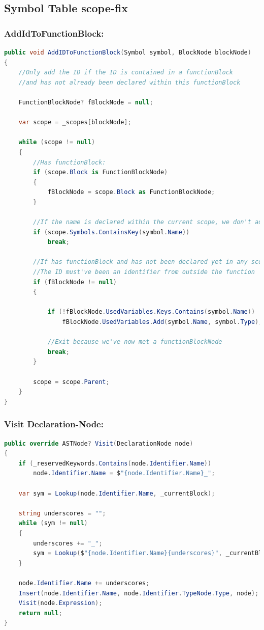 \subsection{Symbol Table scope-fix}
\label{Appendix:ScopeFix}

\subsubsection{AddIdToFunctionBlock:}
\begin{lstlisting}[language = csharp, firstnumber=232, label={list:symbolTable_AddIdToFunction}, caption=AddIdToFunctionBlock - 134-169 - CobraCompiler/SymbolTable.cs]
public void AddIDToFunctionBlock(Symbol symbol, BlockNode blockNode)
{
    //Only add the ID if the ID is contained in a functionBlock
    //and has not already been declared within this functionBlock

    FunctionBlockNode? fBlockNode = null;

    var scope = _scopes[blockNode];

    while (scope != null)
    {
        //Has functionBlock:
        if (scope.Block is FunctionBlockNode)
        {
            fBlockNode = scope.Block as FunctionBlockNode;
        }

        //If the name is declared within the current scope, we don't add it
        if (scope.Symbols.ContainsKey(symbol.Name))
            break;

        //If has functionBlock and has not been declared yet in any scopes,
        //The ID must've been an identifier from outside the function
        if (fBlockNode != null)
        {

            if (!fBlockNode.UsedVariables.Keys.Contains(symbol.Name))
                fBlockNode.UsedVariables.Add(symbol.Name, symbol.Type);

            //Exit because we've now met a functionBlockNode
            break;
        }

        scope = scope.Parent;
    }
}
\end{lstlisting}

\subsubsection{Visit Declaration-Node:}
\begin{lstlisting}[language = csharp, firstnumber=232, label={list:symbolTable_DeclarationNode}, caption=Visit Declaration-Node - 232-250 - CobraCompiler/SymbolTable.cs]
public override ASTNode? Visit(DeclarationNode node)
{
    if (_reservedKeywords.Contains(node.Identifier.Name))
        node.Identifier.Name = $"{node.Identifier.Name}_";

    var sym = Lookup(node.Identifier.Name, _currentBlock);

    string underscores = "";
    while (sym != null)
    {
        underscores += "_";
        sym = Lookup($"{node.Identifier.Name}{underscores}", _currentBlock);
    }

    node.Identifier.Name += underscores;
    Insert(node.Identifier.Name, node.Identifier.TypeNode.Type, node);
    Visit(node.Expression);
    return null;
}
\end{lstlisting}


